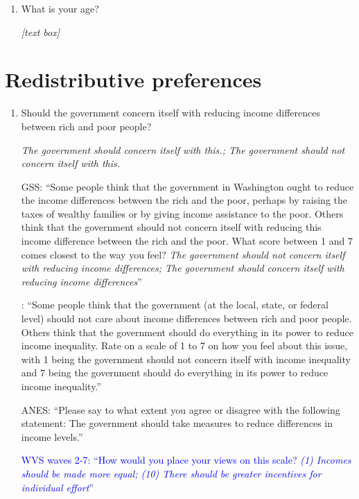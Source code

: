 \documentclass[11pt, headsepline]{article}
\newcommand{\blue}[1]{\textcolor{blue}{#1}}
\newcommand{\green}[1]{\textcolor{sharpgreen}{#1}}
\begin{document}
\begin{enumerate}[resume]

    \item What is your age?

    \textit{[text box]}

\end{enumerate}

\section*{Redistributive preferences}

\begin{enumerate}[resume]
    
    \item Should the government concern itself with reducing income differences between rich and poor people?

    \textit{The government should concern itself with this.; The government should not concern itself with this.}

    \green{GSS: ``Some people think that the government in Washington ought to reduce the income differences between the rich and the poor, perhaps by raising the taxes of wealthy families or by giving income assistance to the poor. Others think that the government should not concern itself with reducing this income difference between the rich and the poor. What score between 1 and 7 comes closest to the way you feel? \textit{The government should not concern itself with reducing income differences; The government should  concern itself with reducing income differences}''}

    \green{\cite{alesina2018intergenerational}: ``Some people think that the government (at the local, state, or federal level) should not care about income differences between rich and poor people. Others think that the government should do everything in its power to reduce income inequality. Rate on a scale of 1 to 7 on how you feel about this issue, with 1 being the government should not concern itself with income inequality and 7 being the government should do everything in its power to reduce income inequality.''}

    \green{ANES: ``Please say to what extent you agree or disagree with the following statement: The government should take measures to reduce differences in income levels.''}

    \blue{WVS waves 2-7: ``How would you place your views on this scale? \textit{(1) Incomes should be made more equal; (10) There should be greater incentives for individual effort}''}


\end{enumerate}
\end{document}
